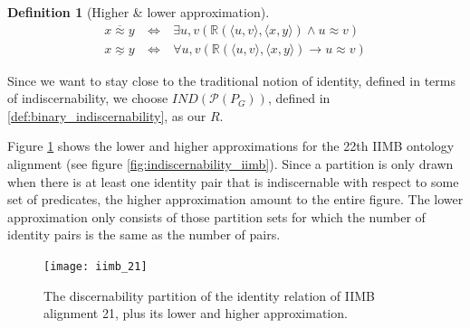 \documentclass[letterpaper]{article}
\newtheorem{definition}{Definition}
\begin{document}
\begin{definition}[Higher \& lower approximation]
\begin{align}
x \overline{\approx} y \  & \iff & \ 
  \exists u,v (
      \mathbb{R}(\langle u, v \rangle, \langle x, y \rangle)
    \land
      u \approx v
  )
\label{def:higher_approximation}
\\
x \underline{\approx} y \  & \iff & \ 
  \forall u,v (
      \mathbb{R}(\langle u, v \rangle, \langle x, y \rangle)
    \rightarrow
      u \approx v
  )
\label{def:lower_approximation}
\end{align}
\end{definition}

Since we want to stay close to the traditional notion of identity, defined in terms of indiscernability, we choose $IND(\mathcal{P}(P_G))$, defined in \ref{def:binary_indiscernability}, as our $R$.

Figure \ref{fig:approximation_iimb} shows the lower and higher approximations for the 22th IIMB ontology alignment (see figure \ref{fig:indiscernability_iimb}). Since a partition is only drawn when there is at least one identity pair that is indiscernable with respect to some set of predicates, the higher approximation amount to the entire figure. The lower approximation only consists of those partition sets for which the number of identity pairs is the same as the number of pairs.

\begin{figure}
\label{fig:approximation_iimb}
\caption{The discernability partition of the identity relation of IIMB alignment 21, plus its lower and higher approximation.}
\texttt{[image: iimb\_21]}
\end{figure}
\end{document}
